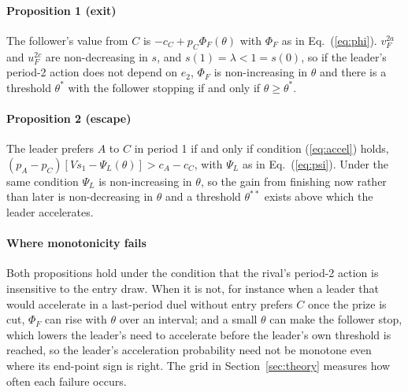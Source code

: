 \documentclass[preprint,12pt,authoryear]{elsarticle}
\begin{document}
\paragraph{Proposition 1 (exit)} The follower's value from $C$ is $-c_C + p_C \Phi_F(\theta)$ with $\Phi_F$ as in Eq.~(\ref{eq:phi}). $v_F^{2a}$ and $u_F^{2c}$ are non-decreasing in $s$, and $s(1) = \lambda < 1 = s(0)$, so if the leader's period-2 action does not depend on $e_2$, $\Phi_F$ is non-increasing in $\theta$ and there is a threshold $\theta^{*}$ with the follower stopping if and only if $\theta \ge \theta^{*}$.

\paragraph{Proposition 2 (escape)} The leader prefers $A$ to $C$ in period 1 if and only if condition (\ref{eq:accel}) holds, $(p_A - p_C)[V s_1 - \Psi_L(\theta)] > c_A - c_C$, with $\Psi_L$ as in Eq.~(\ref{eq:psi}). Under the same condition $\Psi_L$ is non-increasing in $\theta$, so the gain from finishing now rather than later is non-decreasing in $\theta$ and a threshold $\theta^{**}$ exists above which the leader accelerates.

\paragraph{Where monotonicity fails} Both propositions hold under the condition that the rival's period-2 action is insensitive to the entry draw. When it is not, for instance when a leader that would accelerate in a last-period duel without entry prefers $C$ once the prize is cut, $\Phi_F$ can rise with $\theta$ over an interval; and a small $\theta$ can make the follower stop, which lowers the leader's need to accelerate before the leader's own threshold is reached, so the leader's acceleration probability need not be monotone even where its end-point sign is right. The grid in Section~\ref{sec:theory} measures how often each failure occurs.
\end{document}
